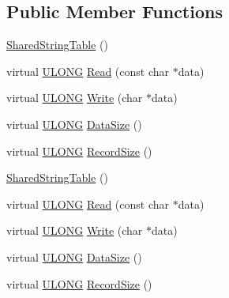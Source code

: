 \subsection*{Public Member Functions}
\begin{DoxyCompactItemize}
\item 
\hyperlink{struct_y_excel_1_1_workbook_1_1_shared_string_table_a0f9539d162d23bbf8bca9766cdb6aafc}{Shared\+String\+Table} ()
\item 
virtual \hyperlink{_basic_excel_8hpp_abe09d1bea023be6a07cbadde8e955435}{U\+L\+O\+N\+G} \hyperlink{struct_y_excel_1_1_workbook_1_1_shared_string_table_acb96fd1ad96092df136701463a4b32c9}{Read} (const char $\ast$data)
\item 
virtual \hyperlink{_basic_excel_8hpp_abe09d1bea023be6a07cbadde8e955435}{U\+L\+O\+N\+G} \hyperlink{struct_y_excel_1_1_workbook_1_1_shared_string_table_a21bf5f473dde8a916b5131de331a25d8}{Write} (char $\ast$data)
\item 
virtual \hyperlink{_basic_excel_8hpp_abe09d1bea023be6a07cbadde8e955435}{U\+L\+O\+N\+G} \hyperlink{struct_y_excel_1_1_workbook_1_1_shared_string_table_a83a828d8fa41f67ca84a8cec19882db5}{Data\+Size} ()
\item 
virtual \hyperlink{_basic_excel_8hpp_abe09d1bea023be6a07cbadde8e955435}{U\+L\+O\+N\+G} \hyperlink{struct_y_excel_1_1_workbook_1_1_shared_string_table_a627898d1a656aff191842d3618ef39f4}{Record\+Size} ()
\item 
\hyperlink{struct_y_excel_1_1_workbook_1_1_shared_string_table_a0f9539d162d23bbf8bca9766cdb6aafc}{Shared\+String\+Table} ()
\item 
virtual \hyperlink{_basic_excel_8hpp_abe09d1bea023be6a07cbadde8e955435}{U\+L\+O\+N\+G} \hyperlink{struct_y_excel_1_1_workbook_1_1_shared_string_table_a0489d306ba17ad670ad03c8f352c7857}{Read} (const char $\ast$data)
\item 
virtual \hyperlink{_basic_excel_8hpp_abe09d1bea023be6a07cbadde8e955435}{U\+L\+O\+N\+G} \hyperlink{struct_y_excel_1_1_workbook_1_1_shared_string_table_a9147be0023e5bcfd96e97950e9aecf75}{Write} (char $\ast$data)
\item 
virtual \hyperlink{_basic_excel_8hpp_abe09d1bea023be6a07cbadde8e955435}{U\+L\+O\+N\+G} \hyperlink{struct_y_excel_1_1_workbook_1_1_shared_string_table_a2698571633a57a3eafd2e7aa8b00d948}{Data\+Size} ()
\item 
virtual \hyperlink{_basic_excel_8hpp_abe09d1bea023be6a07cbadde8e955435}{U\+L\+O\+N\+G} \hyperlink{struct_y_excel_1_1_workbook_1_1_shared_string_table_a88d3c4379d27718da4566526a4b0c4d9}{Record\+Size} ()

\end{DoxyCompactItemize}
